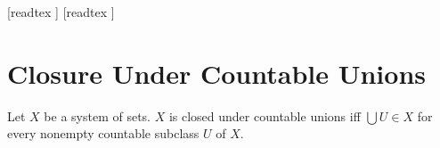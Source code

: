 \documentclass[10pt]{article}
\begin{document}
  \begin{imports}
    \begin{forthel}
      [readtex ]
      [readtex ]
    \end{forthel}
  \end{imports}


  \section*{Closure Under Countable Unions}

  \begin{forthel}
    \begin{definition}[id=FOUNDATIONS_14_2377279311183872,printid]
      Let $X$ be a system of sets.
      $X$ is closed under countable unions iff $\bigcup U \in X$ for every nonempty countable subclass $U$ of $ X$.
    \end{definition}
  \end{forthel}
\end{document}
